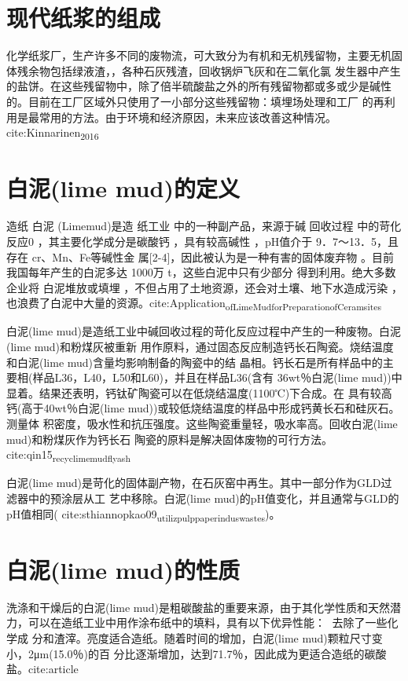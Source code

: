 \documentclass[11pt]{article}
\begin{document}
\section{现代纸浆的组成}
\label{sec:org792d707}
化学纸浆厂，生产许多不同的废物流，可大致分为有机和无机残留物，主要无机固体残余物包括绿液渣，，各种石灰残渣，回收锅炉飞灰和在二氧化氯
发生器中产生的盐饼。在这些残留物中，除了倍半硫酸盐之外的所有残留物都或多或少是碱性
的。目前在工厂区域外只使用了一小部分这些残留物：填埋场处理和工厂
的再利用是最常用的方法。由于环境和经济原因，未来应该改善这种情况。cite:Kinnarinen\textsubscript{2016}

\section{白泥(lime mud)的定义}
\label{sec:org85bdc8b}
造纸 白泥 (Limemud)是造 纸工业 中的一种副产品，来源于碱 回收过程 中的苛化反应0 ，其主要化学成分是碳酸钙 ，具有较高碱性 ，pH值介于 9．7～13．5，且存在 cr、Mn、Fe等碱性金 属[2-4]，因此被认为是一种有害的固体废弃物 。目前我国每年产生的白泥多达 1000万 t，这些白泥中只有少部分 得到利用。绝大多数企业将 白泥堆放或填埋 ，不但占用了土地资源，还会对土壤、地下水造成污染 ，也浪费了白泥中大量的资源。cite:Application\textsubscript{ofLim}\textsubscript{eM}\textsubscript{ud}\textsubscript{forPreparation}\textsubscript{ofCeram}\textsubscript{sites}

白泥(lime mud)是造纸工业中碱回收过程的苛化反应过程中产生的一种废物。白泥(lime mud)和粉煤灰被重新
用作原料，通过固态反应制造钙长石陶瓷。烧结温度和白泥(lime mud)含量均影响制备的陶瓷中的结
晶相。钙长石是所有样品中的主要相(样品L36，L40，L50和L60)，并且在样品L36(含有
36wt％白泥(lime mud))中显着。结果还表明，钙钛矿陶瓷可以在低烧结温度(1100℃)下合成。在
具有较高钙(高于40wt％白泥(lime mud))或较低烧结温度的样品中形成钙黄长石和硅灰石。测量体
积密度，吸水性和抗压强度。这些陶瓷重量轻，吸水率高。回收白泥(lime mud)和粉煤灰作为钙长石
陶瓷的原料是解决固体废物的可行方法。 cite:qin15\textsubscript{recyc}\textsubscript{lime}\textsubscript{mud}\textsubscript{fly}\textsubscript{ash}

白泥(lime mud)是苛化的固体副产物，在石灰窑中再生。其中一部分作为GLD过滤器中的预涂层从工
艺中移除。白泥(lime mud)的pH值变化，并且通常与GLD的pH值相同(
cite:sthiannopkao09\textsubscript{utiliz}\textsubscript{pulp}\textsubscript{paper}\textsubscript{indus}\textsubscript{wastes})。


\section{白泥(lime mud)的性质}
\label{sec:orga250325}
洗涤和干燥后的白泥(lime mud)是粗碳酸盐的重要来源，由于其化学性质和天然潜力，可以在造纸工业中用作涂布纸中的填料，具有以下优异性能： 去除了一些化学成
分和渣滓。亮度适合造纸。随着时间的增加，白泥(lime mud)颗粒尺寸变小，2μm(15.0％)的百
分比逐渐增加，达到71.7％，因此成为更适合造纸的碳酸盐。cite:article
\end{document}
